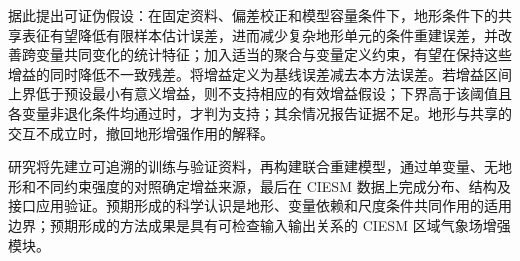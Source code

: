 据此提出可证伪假设：在固定资料、偏差校正和模型容量条件下，地形条件下的共享表征有望降低有限样本估计误差，进而减少复杂地形单元的条件重建误差，并改善跨变量共同变化的统计特征；加入适当的聚合与变量定义约束，有望在保持这些增益的同时降低不一致残差。将增益定义为基线误差减去本方法误差。若增益区间上界低于预设最小有意义增益，则不支持相应的有效增益假设；下界高于该阈值且各变量非退化条件均通过时，才判为支持；其余情况报告证据不足。地形与共享的交互不成立时，撤回地形增强作用的解释。

研究将先建立可追溯的训练与验证资料，再构建联合重建模型，通过单变量、无地形和不同约束强度的对照确定增益来源，最后在 CIESM 数据上完成分布、结构及接口应用验证。预期形成的科学认识是地形、变量依赖和尺度条件共同作用的适用边界；预期形成的方法成果是具有可检查输入输出关系的 CIESM 区域气象场增强模块。
